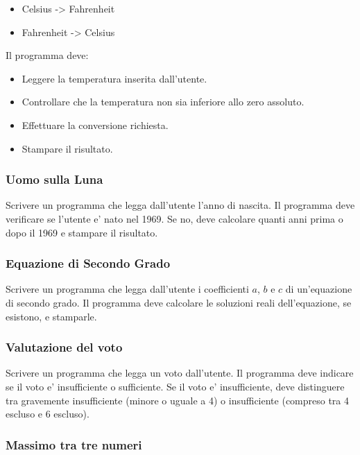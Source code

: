 \documentclass[a4paper,12pt]{article}
\begin{document}
	\begin{itemize}
		\item Celsius -> Fahrenheit
		\item Fahrenheit -> Celsius
	\end{itemize}
	
	
	
	Il programma deve:
	\begin{itemize}
		\item Leggere la temperatura inserita dall’utente.
		\item Controllare che la temperatura non sia inferiore allo zero assoluto.
		\item Effettuare la conversione richiesta.
		\item Stampare il risultato.
	\end{itemize}
	
	
	\subsubsection{Uomo sulla Luna}
	Scrivere un programma che legga dall'utente l'anno di nascita. 
	Il programma deve verificare se l'utente e' nato nel 1969. 
	Se no, deve calcolare quanti anni prima o dopo il 1969 e stampare il risultato.
	
	
	\subsubsection{Equazione di Secondo Grado}
	Scrivere un programma che legga dall'utente i coefficienti $a$, $b$ e $c$ di un'equazione di secondo grado. 
	Il programma deve calcolare le soluzioni reali dell'equazione, se esistono, e stamparle.
	
	
	
	\subsubsection{Valutazione del voto}
	
	Scrivere un programma che legga un voto dall'utente. 
	Il programma deve indicare se il voto e' insufficiente o sufficiente. 
	Se il voto e' insufficiente, deve distinguere tra gravemente insufficiente (minore o uguale a 4) o insufficiente (compreso tra 4 escluso e 6 escluso).
	
	
	\subsubsection{Massimo tra tre numeri}
	
\end{document}
